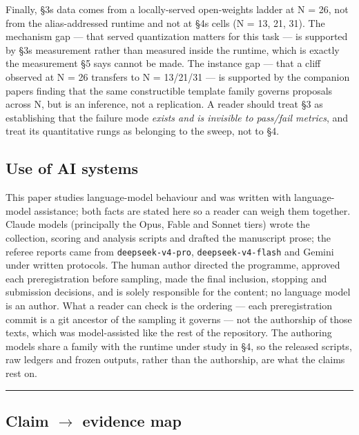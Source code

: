 Finally, §3\textquotesingle s data comes from a locally-served open-weights ladder at N = 26, not from the alias-addressed runtime and not at §4\textquotesingle s cells (N = 13, 21, 31). The mechanism gap --- that served quantization matters for this task --- is supported by §3\textquotesingle s measurement rather than measured inside the runtime, which is exactly the measurement §5 says cannot be made. The instance gap --- that a cliff observed at N = 26 transfers to N = 13/21/31 --- is supported by the companion paper\textquotesingle s finding that the same constructible template family governs proposals across N, but is an inference, not a replication. A reader should treat §3 as establishing that the failure mode \emph{exists and is invisible to pass/fail metrics}, and treat its quantitative rungs as belonging to the sweep, not to §4.

\hypertarget{use-of-ai-systems}{%
\subsection*{Use of AI systems}\label{use-of-ai-systems}}

This paper studies language-model behaviour and was written with language-model assistance; both facts are stated here so a reader can weigh them together. Claude models (principally the Opus, Fable and Sonnet tiers) wrote the collection, scoring and analysis scripts and drafted the manuscript prose; the referee reports came from \texttt{deepseek-v4-pro}, \texttt{deepseek-v4-flash} and Gemini under written protocols. The human author directed the programme, approved each preregistration before sampling, made the final inclusion, stopping and submission decisions, and is solely responsible for the content; no language model is an author. What a reader can check is the ordering --- each preregistration commit is a git ancestor of the sampling it governs --- not the authorship of those texts, which was model-assisted like the rest of the repository. The authoring models share a family with the runtime under study in §4, so the released scripts, raw ledgers and frozen outputs, rather than the authorship, are what the claims rest on.

\begin{center}\rule{0.5\linewidth}{0.5pt}\end{center}

\hypertarget{claim-rightarrow-evidence-map}{%
\subsection{\texorpdfstring{Claim \(\rightarrow\) evidence map}{Claim \textbackslash rightarrow evidence map}}\label{claim-rightarrow-evidence-map}}

